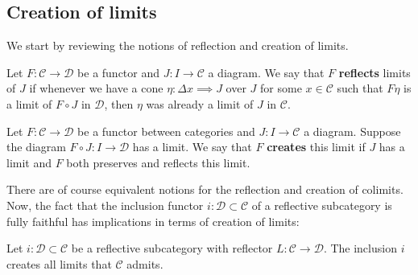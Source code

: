 \subsection{Creation of limits} %
\label{sub:Creation of limits}
We start by reviewing the notions of reflection and creation of limits.
\begin{definition}
  Let $ F: \mathcal{C} \to \mathcal{D} $ be a functor and $ J:I \to \mathcal{C} $ a diagram. We say that $ F $ \textbf{reflects} limits of $ J $ if whenever we have a cone $ \eta: \Delta x \implies J $ over $ J $ for some $ x \in \mathcal{C} $ such that $ F\eta $ is a limit of $ F\circ J $ in $ \mathcal{D} $, then $ \eta $ was already a limit of $ J $ in $ \mathcal{C} $.
\end{definition}
\begin{definition}
  Let $ F: \mathcal{C} \to \mathcal{D} $ be a functor between categories and $ J: I \to \mathcal{C} $ a diagram. Suppose the diagram $ F \circ J: I \to \mathcal{D} $ has a limit. We say that $ F $ \textbf{creates} this limit if $ J $ has a limit and $ F $ both preserves and reflects this limit.
\end{definition}
There are of course equivalent notions for the reflection and creation of colimits. Now, the fact that the inclusion functor $ i: \mathcal{D} \subset \mathcal{C} $ of a reflective subcategory is fully faithful has implications in terms of creation of limits:
\begin{proposition}
  \label{prop:creates}
  Let $ i: \mathcal{D} \subset \mathcal{C} $ be a reflective subcategory with reflector $ L:\mathcal{C} \to \mathcal{D} $. The inclusion $ i $ creates all limits that $ \mathcal{C} $ admits.
\end{proposition}
